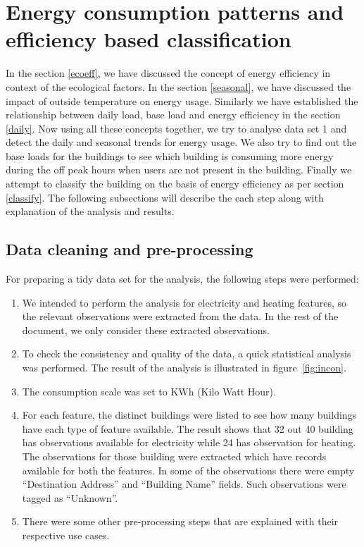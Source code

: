 \section{Energy consumption patterns and efficiency based classification}
In the section \ref{ecoeff}, we have discussed the concept of energy efficiency in context of the ecological factors. In the section \ref{seasonal}, we have discussed the impact of outside temperature on energy usage. Similarly we have established the relationship between daily load, base load and energy efficiency in the section \ref{daily}. Now using all these concepts together, we try to analyse data set 1 and detect the daily and seasonal trends for energy usage. We also try to find out the base loads for the buildings to see which building is consuming more energy during the off peak hours when users are not present in the building. Finally we attempt to classify the building on the basis of energy efficiency as per section \ref{classify}. The following subsections will describe the each step along with explanation of the analysis and results.
\subsection{Data cleaning and pre-processing} \label{cleaning}
For preparing a tidy data set for the analysis, the following steps were performed:
\begin{enumerate}
\item We intended to perform the analysis for electricity and heating features, so the relevant observations were extracted from the data. In the rest of the document, we only consider these extracted observations.
\item To check the consistency and quality of the data, a quick statistical analysis was performed. The result of the analysis is illustrated in figure~\ref{fig:incon}.
\item The consumption scale was set to KWh (Kilo Watt Hour).
\item For each feature, the distinct buildings were listed to see how many buildings have each type of feature available. The result shows that 32 out 40 building has observations available for electricity while 24 has observation for heating. The observations for those building were extracted which have records available for both the features. In some of the observations there were empty ``Destination Address'' and ``Building Name'' fields. Such observations were tagged as ``Unknown''. 
\item There were some other pre-processing steps that are explained with their respective use cases.
\end{enumerate}

